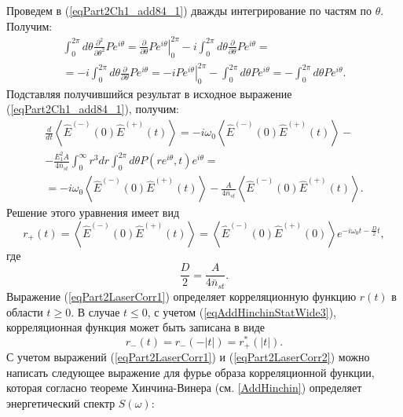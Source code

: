 Проведем в (\ref{eqPart2Ch1_add84_1}) дважды интегрирование по частям
по $\theta$. Получим:
\begin{eqnarray}
\int_0^{2 \pi}
d \theta
\frac{\partial^2}{\partial \theta^2}P e^{i \theta} = 
\left.\frac{\partial}{\partial \theta}P e^{i \theta}\right|_0^{2 \pi}
- 
i \int_0^{2 \pi}
d \theta
\frac{\partial}{\partial \theta}P e^{i \theta} = 
\nonumber \\
= - i \int_0^{2 \pi}
d \theta
\frac{\partial}{\partial \theta}P e^{i \theta}  
= 
- i \left.P e^{i \theta}\right|_0^{2 \pi}
-
\int_0^{2 \pi}
d \theta
P e^{i \theta} = 
- \int_0^{2 \pi}
d \theta
P e^{i \theta}.
\nonumber
\end{eqnarray}
Подставляя получившийся результат в исходное выражение
(\ref{eqPart2Ch1_add84_1}), получим:
\begin{eqnarray}
\frac{d}{dt}\left<\hat{E}^{(-)}\left(0\right)\hat{E}^{(+)}\left(t\right)\right>
=
-i \omega_0
\left<\hat{E}^{(-)}\left(0\right)\hat{E}^{(+)}\left(t\right)\right>-
\nonumber \\
-
\frac{E_1^2 A}{4 \bar{n}_{st}} 
\int_0^{\infty}r^3 d r 
\int_0^{2 \pi}
d \theta
P\left(r
e^{i \theta}, t\right) e^{i \theta} = 
\nonumber \\
=-i \omega_0
\left<\hat{E}^{(-)}\left(0\right)\hat{E}^{(+)}\left(t\right)\right> -
\frac{A}{4 \bar{n}_{st}}\left<\hat{E}^{(-)}\left(0\right)\hat{E}^{(+)}\left(t\right)\right>.
\nonumber
\end{eqnarray}
Решение этого уравнения имеет вид
\begin{equation}
r_{+}\left(t\right) = \left<\hat{E}^{(-)}\left(0\right)\hat{E}^{(+)}\left(t\right)\right> =
\left<\hat{E}^{(-)}\left(0\right)\hat{E}^{(+)}\left(0\right)\right>
e^{-i \omega_0 t - \frac{D}{2}t},
\label{eqPart2LaserCorr1}
\end{equation}
где
\[
\frac{D}{2} = \frac{A}{4 \bar{n}_{st}}.
\]
Выражение (\ref{eqPart2LaserCorr1}) определяет корреляционную функцию
$r\left(t\right)$ в области $t \ge 0$. В случае $t \le 0$, с учетом
(\ref{eqAddHinchinStatWide3}), корреляционная функция может быть
записана в виде  
\begin{equation}
r_{-}\left(t\right) = r_{-}\left(-\left|t\right|\right) =
r_{+}^{*}\left(\left|t\right|\right). 
\label{eqPart2LaserCorr2}
\end{equation}
С учетом выражений (\ref{eqPart2LaserCorr1}) и
(\ref{eqPart2LaserCorr2}) можно написать следующее выражение для фурье
образа корреляционной функции, которая согласно теореме Хинчина-Винера
(см. \autoref{AddHinchin})
определяет энергетический спектр $S\left(\omega\right)$:
